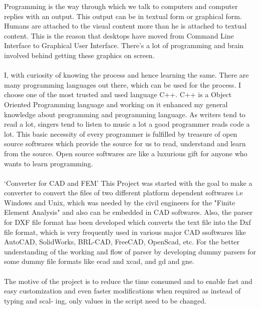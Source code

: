\begin{Large}
\end{Large}
Programming  is  the  way  through  which  we  talk  to  computers  and  computer  replies with an output. This
output  can  be  in  textual  form  or  graphical  form.  Humans are attached to the visual content more than he
is  attached  to  textual  content.  This  is  the  reason  that  desktops  have  moved  from  Command  Line
Interface  to  Graphical  User  Interface.  There's  a  lot  of  programming  and  brain  involved  behind  getting
these  graphics  on  screen.\\\\
I,  with  curiosity  of  knowing  the  process  and  hence  learning  the  same.  There
are many programming languages out there, which can be used for the  process.  I choose one of the most
trusted  and  used  language  C++.  C++  is  a  Object  Oriented  Programming  language  and  working  on  it
enhanced  my  general  knowledge  about  programming  and  programming  language.  As   writers  tend  to
read  a  lot,  singers  tend  to  listen  to music a lot a good programmer reads code a lot. This basic necessity
of  every  programmer  is  fulfilled  by treasure of open source softwares which provide the source for us to
read,  understand  and  learn  from  the  source.  Open  source  softwares  are  like  a  luxurious  gift  for anyone
who wants to learn programming.\\\\
‘Converter for CAD and FEM’ This Project was started with the goal to make a converter to convert the files of two different platform dependent softwares i.e Windows and Unix, which was needed by the civil engineers for the "Finite Element Analysis" and also can be embedded in CAD softwares. Also, the parser for DXF file format has been developed which converts the text file into the Dxf file format, which is very frequently used in various major CAD ssoftwares like AutoCAD, SolidWorks, BRL-CAD, FreeCAD, OpenScad, etc. For the better understanding of the working and flow of parser by developing dummy parsers for some dummy file formats like ecad and xcad, and gd and gne.\\\\
The motive of the project is to reduce the time consumed and to enable fast and easy
customization and even faster modifications when required as instead of typing and scal-
ing, only values in the script need to be changed.

